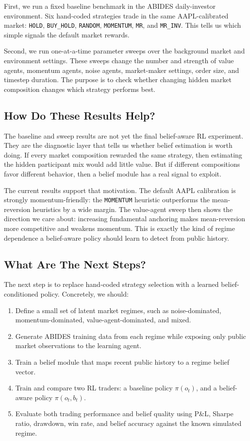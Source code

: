 \documentclass[11pt]{article}
\begin{document}
First, we run a fixed baseline benchmark in the ABIDES daily-investor
environment. Six hand-coded strategies trade in the same AAPL-calibrated market:
\texttt{HOLD}, \texttt{BUY\_HOLD}, \texttt{RANDOM}, \texttt{MOMENTUM},
\texttt{MR}, and \texttt{MR\_INV}. This tells us which simple signals the
default market rewards.

Second, we run one-at-a-time parameter sweeps over the background market and
environment settings. These sweeps change the number and strength of value
agents, momentum agents, noise agents, market-maker settings, order size, and
timestep duration. The purpose is to check whether changing hidden market
composition changes which strategy performs best.

\subsection{How Do These Results Help?}

The baseline and sweep results are not yet the final belief-aware RL experiment.
They are the diagnostic layer that tells us whether belief estimation is worth
doing. If every market composition rewarded the same strategy, then estimating
the hidden participant mix would add little value. But if different
compositions favor different behavior, then a belief module has a real signal
to exploit.

The current results support that motivation. The default AAPL calibration is
strongly momentum-friendly: the \texttt{MOMENTUM} heuristic outperforms the
mean-reversion heuristics by a wide margin. The value-agent sweep then shows
the direction we care about: increasing fundamental anchoring makes
mean-reversion more competitive and weakens momentum. This is exactly the kind
of regime dependence a belief-aware policy should learn to detect from public
history.

\subsection{What Are The Next Steps?}

The next step is to replace hand-coded strategy selection with a learned
belief-conditioned policy. Concretely, we should:

\begin{enumerate}
    \item Define a small set of latent market regimes, such as
    noise-dominated, momentum-dominated, value-agent-dominated, and mixed.
    \item Generate ABIDES training data from each regime while exposing only
    public market observations to the learning agent.
    \item Train a belief module that maps recent public history to a regime
    belief vector.
    \item Train and compare two RL traders: a baseline policy
    \(\pi(o_t)\), and a belief-aware policy \(\pi(o_t, b_t)\).
    \item Evaluate both trading performance and belief quality using P\&L,
    Sharpe ratio, drawdown, win rate, and belief accuracy against the known
    simulated regime.
\end{enumerate}
\end{document}
